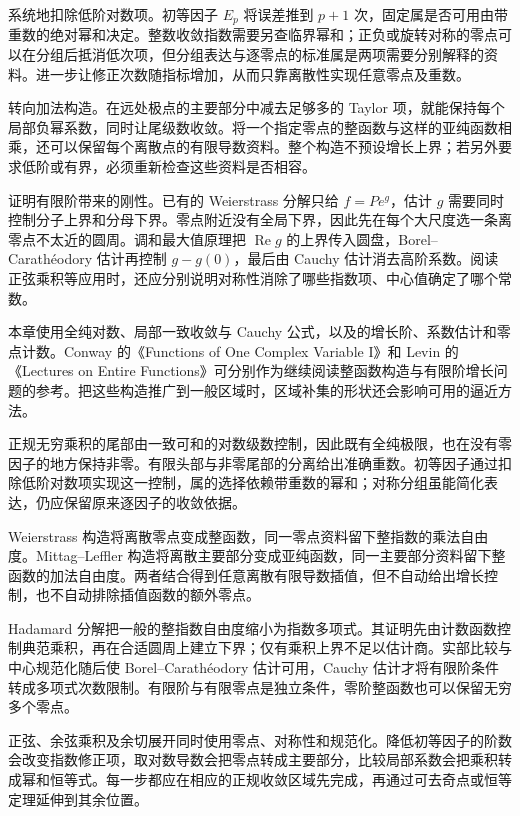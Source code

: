 \ProseParagraphBreak
{}系统地扣除低阶对数项。初等因子 \(E_p\) 将误差推到 \(p+1\) 次，固定属是否可用由带重数的绝对幂和决定。整数收敛指数需要另查临界幂和；正负或旋转对称的零点可以在分组后抵消低次项，但分组表达与逐零点的标准属是两项需要分别解释的资料。进一步让修正次数随指标增加，从而只靠离散性实现任意零点及重数。

\ProseParagraphBreak
{}转向加法构造。在远处极点的主要部分中减去足够多的 Taylor 项，就能保持每个局部负幂系数，同时让尾级数收敛。将一个指定零点的整函数与这样的亚纯函数相乘，还可以保留每个离散点的有限导数资料。整个构造不预设增长上界；若另外要求低阶或有界，必须重新检查这些资料是否相容。

\ProseParagraphBreak
{}证明有限阶带来的刚性。已有的 Weierstrass 分解只给 \(f=P e^g\)，估计 \(g\) 需要同时控制分子上界和分母下界。零点附近没有全局下界，因此先在每个大尺度选一条离零点不太近的圆周。调和最大值原理把 \(\operatorname{Re}g\) 的上界传入圆盘，Borel--Carathéodory 估计再控制 \(g-g(0)\)，最后由 Cauchy 估计消去高阶系数。阅读正弦乘积等应用时，还应分别说明对称性消除了哪些指数项、中心值确定了哪个常数。

\ProseParagraphBreak
本章使用全纯对数、局部一致收敛与 Cauchy 公式，以及的增长阶、系数估计和零点计数。Conway 的《Functions of One Complex Variable I》\cite{Conway1978Functions}和 Levin 的《Lectures on Entire Functions》\cite{Levin1996Lectures}可分别作为继续阅读整函数构造与有限阶增长问题的参考。把这些构造推广到一般区域时，区域补集的形状还会影响可用的逼近方法。







\begin{chaptersummary}
正规无穷乘积的尾部由一致可和的对数级数控制，因此既有全纯极限，也在没有零因子的地方保持非零。有限头部与非零尾部的分离给出准确重数。初等因子通过扣除低阶对数项实现这一控制，属的选择依赖带重数的幂和；对称分组虽能简化表达，仍应保留原来逐因子的收敛依据。

\ProseParagraphBreak
Weierstrass 构造将离散零点变成整函数，同一零点资料留下整指数的乘法自由度。Mittag--Leffler 构造将离散主要部分变成亚纯函数，同一主要部分资料留下整函数的加法自由度。两者结合得到任意离散有限导数插值，但不自动给出增长控制，也不自动排除插值函数的额外零点。

\ProseParagraphBreak
Hadamard 分解把一般的整指数自由度缩小为指数多项式。其证明先由计数函数控制典范乘积，再在合适圆周上建立下界；仅有乘积上界不足以估计商。实部比较与中心规范化随后使 Borel--Carathéodory 估计可用，Cauchy 估计才将有限阶条件转成多项式次数限制。有限阶与有限零点是独立条件，零阶整函数也可以保留无穷多个零点。

\ProseParagraphBreak
正弦、余弦乘积及余切展开同时使用零点、对称性和规范化。降低初等因子的阶数会改变指数修正项，取对数导数会把零点转成主要部分，比较局部系数会把乘积转成幂和恒等式。每一步都应在相应的正规收敛区域先完成，再通过可去奇点或恒等定理延伸到其余位置。
\end{chaptersummary}

